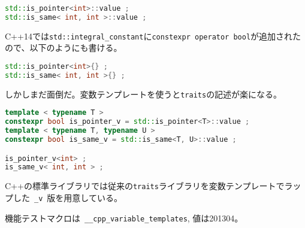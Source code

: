 \begin{lstlisting}[language=C++]
std::is_pointer<int>::value ;
std::is_same< int, int >::value ;
\end{lstlisting}

C++14では\lstinline!std::integral_constant!に\lstinline!constexpr operator bool!が追加されたので、以下のようにも書ける。

\begin{lstlisting}[language=C++]
std::is_pointer<int>{} ;
std::is_same< int, int >{} ;
\end{lstlisting}

しかしまだ面倒だ。変数テンプレートを使うと\lstinline!traits!の記述が楽になる。

\begin{lstlisting}[language=C++]
template < typename T >
constexpr bool is_pointer_v = std::is_pointer<T>::value ;
template < typename T, typename U >
constexpr bool is_same_v = std::is_same<T, U>::value ;

is_pointer_v<int> ;
is_same_v< int, int > ;
\end{lstlisting}

C++の標準ライブラリでは従来の\lstinline!traits!ライブラリを変数テンプレートでラップした~\lstinline!_v!~版を用意している。

機能テストマクロは~\lstinline!__cpp_variable_templates!, 値は201304。
